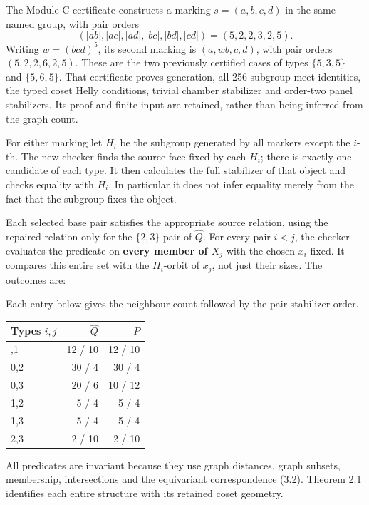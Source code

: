 \documentclass[
  11pt,
  a4paper,
]{article}
\newcounter{none} %
\renewcommand{\texttt}[1]{{\ttfamily\seqsplit{#1}}}
\begin{document}
The Module C certificate \texttt{phase40\_compress\_operations\_check.g}
constructs a marking \(s=(a,b,c,d)\) in the same named group, with pair
orders \[
 (|ab|,|ac|,|ad|,|bc|,|bd|,|cd|)=(5,2,2,3,2,5).
\] Writing \(w=(bcd)^5\), its second marking is \((a,wb,c,d)\), with
pair orders \((5,2,2,6,2,5)\). These are the two previously certified
cases of types \(\{5,3,5\}\) and \(\{5,6,5\}\). That certificate proves
generation, all 256 subgroup-meet identities, the typed coset Helly
conditions, trivial chamber stabilizer and order-two panel stabilizers.
Its proof and finite input are retained, rather than being inferred from
the graph count.

For either marking let \(H_i\) be the subgroup generated by all markers
except the \(i\)-th. The new checker finds the source face fixed by each
\(H_i\); there is exactly one candidate of each type. It then calculates
the full stabilizer of that object and checks equality with \(H_i\). In
particular it does not infer equality merely from the fact that the
subgroup fixes the object.

Each selected base pair satisfies the appropriate source relation, using
the repaired relation only for the \(\{2,3\}\) pair of \(\widehat Q\).
For every pair \(i<j\), the checker evaluates the predicate on
\textbf{every member of \(X_j\)} with the chosen \(x_i\) fixed. It
compares this entire set with the \(H_i\)-orbit of \(x_j\), not just
their sizes. The outcomes are:

Each entry below gives the neighbour count followed by the pair
stabilizer order.

{\def\LTcaptype{none} %
\begin{longtable}[]{@{}lrr@{}}
\toprule\noalign{}
Types \(i,j\) & \(\widehat Q\) & \(P\) \\
\midrule\noalign{}
\endhead
\bottomrule\noalign{}
\endlastfoot
0,1 & 12 / 10 & 12 / 10 \\
0,2 & 30 / 4 & 30 / 4 \\
0,3 & 20 / 6 & 10 / 12 \\
1,2 & 5 / 4 & 5 / 4 \\
1,3 & 5 / 4 & 5 / 4 \\
2,3 & 2 / 10 & 2 / 10 \\
\end{longtable}
}

All predicates are invariant because they use graph distances, graph
subsets, membership, intersections and the equivariant correspondence
(3.2). Theorem 2.1 identifies each entire structure with its retained
coset geometry.
\end{document}
